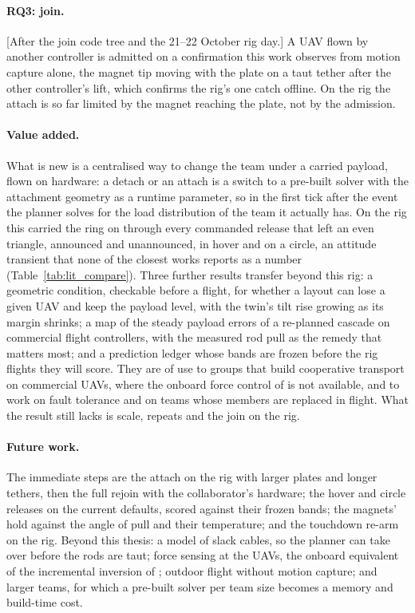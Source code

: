 \paragraph{RQ3: join.} [After the join code tree and the 21--22 October rig day.] A UAV flown by another controller is
admitted on a confirmation this work observes from motion capture alone, the magnet tip moving with the plate on a
taut tether after the other controller's lift, which confirms the rig's one catch offline. On the rig the attach is
so far limited by the magnet reaching the plate, not by the admission.

\paragraph{Value added.} What is new is a centralised way to change the team under a carried payload, flown on
hardware: a detach or an attach is a switch to a pre-built solver with the attachment geometry as a runtime parameter,
so in the first tick after the event the planner solves for the load distribution of the team it actually has. On the
rig this carried the ring on through every commanded release that left an even triangle, announced and unannounced,
in hover and on a circle, an attitude transient that none of the closest works reports as a number
(Table~\ref{tab:lit_compare}). Three further results transfer beyond this rig: a geometric condition, checkable before a
flight, for whether a layout can lose a given UAV and keep the payload level, with the twin's tilt rise growing as its
margin shrinks; a map of the steady payload errors of a re-planned cascade on commercial flight controllers, with the
measured rod pull as the remedy that matters most; and a prediction ledger whose bands are frozen before the rig flights they
will score. They are of use to groups that build cooperative transport on commercial UAVs,
where the onboard force control of \cite{tudelft} is not available, and to work on fault tolerance and on teams whose
members are replaced in flight. What the result still lacks is scale, repeats and the join on the rig.

\paragraph{Future work.} The immediate steps are the attach on the rig with larger plates and longer tethers, then the
full rejoin with the collaborator's hardware; the hover and circle releases on the current defaults, scored against
their frozen bands; the magnets' hold against the angle of pull and their temperature; and the touchdown re-arm on the
rig. Beyond this thesis: a model of slack cables, so the planner can take over before the rods are taut; force sensing
at the UAVs, the onboard equivalent of the incremental inversion of \cite{tudelft}; outdoor flight without motion
capture; and larger teams, for which a pre-built solver per team size becomes a memory and build-time cost.
